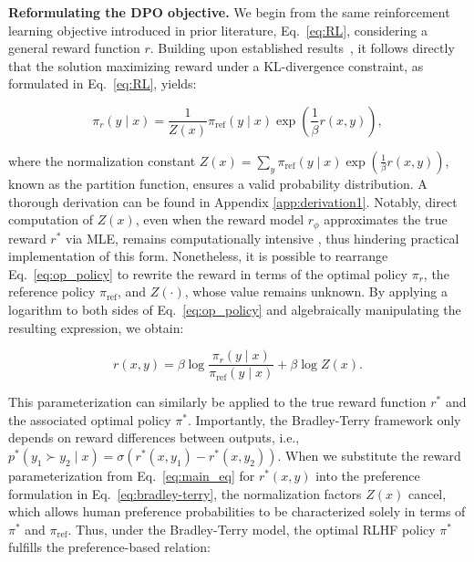 \textbf{Reformulating the DPO objective.} We begin from the same reinforcement learning objective introduced in prior literature, Eq.~\ref{eq:RL}, considering a general reward function $r$. Building upon established results~\citep{peters2007reinforcement, peng2019advantage, korbak2022reinforcement, go2023aligning}, it follows directly that the solution maximizing reward under a KL-divergence constraint, as formulated in Eq.~\ref{eq:RL}, yields:

\begin{equation}\label{eq:op_policy}
    \pi_r(y\mid x) = \frac{1}{Z(x)}\pi_\text{ref}(y\mid x)\exp\left(\frac{1}{\beta}r(x, y)\right),
\end{equation}

where the normalization constant $Z(x) =\sum_{y}\pi_\text{ref}(y\mid x)\exp\left(\frac{1}{\beta}r(x, y)\right)$, known as the partition function, ensures a valid probability distribution. A thorough derivation can be found in Appendix \ref{app:derivation1}. Notably, direct computation of $Z(x)$, even when the reward model $r_{\phi}$ approximates the true reward $r^*$ via MLE, remains computationally intensive \citep{korbak2022reinforcement, go2023aligning}, thus hindering practical implementation of this form. Nonetheless, it is possible to rearrange Eq.~\ref{eq:op_policy} to rewrite the reward in terms of the optimal policy $\pi_r$, the reference policy $\pi_\text{ref}$, and $Z(\cdot)$, whose value remains unknown. By applying a logarithm to both sides of Eq.~\ref{eq:op_policy} and algebraically manipulating the resulting expression, we obtain:

\begin{equation}\label{eq:main_eq}
    r(x,y) =\beta \log \frac{\pi_r(y\mid x)}{\pi_\text{ref}(y\mid x)} + \beta \log Z(x).
\end{equation}

This parameterization can similarly be applied to the true reward function $r^*$ and the associated optimal policy $\pi^*$. Importantly, the Bradley-Terry framework only depends on reward differences between outputs, i.e., ${p^*(y_1 \succ y_2 \mid x) = \sigma(r^*(x, y_1) - r^*(x, y_2))}$. When we substitute the reward parameterization from Eq.~\ref{eq:main_eq} for $r^*(x,y)$ into the preference formulation in Eq.~\ref{eq:bradley-terry}, the normalization factors $Z(x)$ cancel, which allows human preference probabilities to be characterized solely in terms of $\pi^*$ and $\pi_\text{ref}$. Thus, under the Bradley-Terry model, the optimal RLHF policy $\pi^*$ fulfills the preference-based relation:

